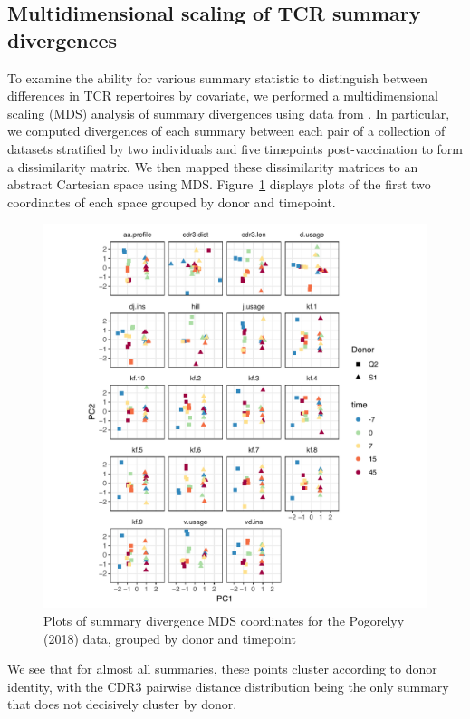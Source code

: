 \documentclass{article}
\begin{document}
\subsection*{Multidimensional scaling of TCR summary divergences}
To examine the ability for various summary statistic to distinguish between differences in TCR repertoires by covariate, we performed a multidimensional scaling (MDS) analysis of summary divergences using data from \cite{Pogorelyy2018-ak}.
In particular, we computed divergences of each summary between each pair of a collection of datasets stratified by two individuals and five timepoints post-vaccination to form a dissimilarity matrix.
We then mapped these dissimilarity matrices to an abstract Cartesian space using MDS.
Figure~\ref{fig:TCR_MDS} displays plots of the first two coordinates of each space grouped by donor and timepoint.
\begin{figure}
    \includegraphics[width=\linewidth]{Figures/tcr_pca.pdf}
    \caption{Plots of summary divergence MDS coordinates for the Pogorelyy (2018) data, grouped by donor and timepoint}
    \label{fig:TCR_MDS}
\end{figure}
We see that for almost all summaries, these points cluster according to donor identity, with the CDR3 pairwise distance distribution being the only summary that does not decisively cluster by donor.
\end{document}
